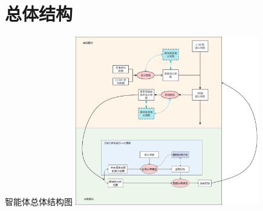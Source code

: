 \section{总体结构}
\begin{frame}{智能体总体结构图}
    \centering
    \includegraphics[width=8cm]{assets/integration.png}
\end{frame}